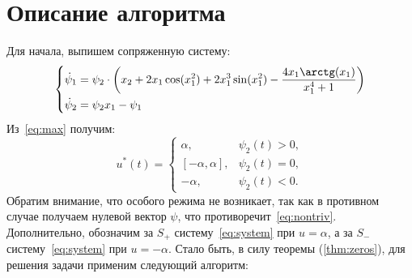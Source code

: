 \documentclass[11pt, oneside, final]{article}
\theoremstyle{break}
\numberwithin{equation}{section}
\theoremstyle{plain}
\theoremstyle{definition}
\begin{document}
    \section{Описание алгоритма}
    \label{subs:conj} 
    Для начала, выпишем сопряженную систему:
    \begin{equation}
        \label{eq:sys:conj}
        \left\{
        \begin{aligned}
            & \dot \psi_1 = \psi_2\cdot\left(x_2 + 2 x_1\cos(x_1^2) + 2 x_1^3\sin(x_1^2) - \dfrac{4x_1\arctg(x_1)}{x_1^4 + 1}\right)\\
            & \dot \psi_2 = \psi_2 x_1 - \psi_1\\
        \end{aligned}
        \right.
    \end{equation}
    Из~\eqref{eq:max} получим:
    \[
    u^*(t)=\begin{cases}
    \alpha,&\psi_2(t)>0,\\
    [-\alpha,\alpha],&\psi_2(t)=0,\\
    -\alpha,&\psi_2(t)<0.
    \end{cases}
    \]
    Обратим внимание, что особого режима не возникает, так как в противном случае получаем нулевой вектор \( \psi \), что противоречит~\eqref{eq:nontriv}.
    Дополнительно, обозначим за \(S_+\) систему~\eqref{eq:system} при \(u = \alpha\), а за \(S_-\) систему~\eqref{eq:system} при \(u = -\alpha\). Стало быть, в силу теоремы (\ref{thm:zeros}), для решения задачи применим следующий алгоритм:
\end{document}
